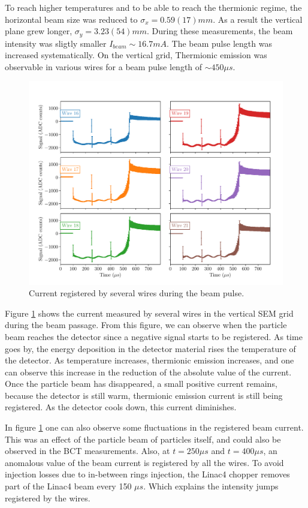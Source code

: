 To reach higher temperatures and to be able to reach the thermionic regime, the horizontal beam size was reduced to $\sigma_x = 0.59(17) mm$. As a result the vertical plane grew longer, $\sigma_y = 3.23(54) mm$. During these measurements, the beam intensity was sligtly smaller $I_{beam} \sim 16.7 mA$. The beam pulse length was increased systematically. On the vertical grid, Thermionic emission was observable in various wires for a beam pulse length of $\sim 450 \mu s$. 

\begin{figure}[h]
    \centering
    \includegraphics[width=0.9\columnwidth]{Figure_ThermionicMeasurements/VerticalThermoCurrent.pdf}
    \caption{Current registered by several wires during the beam pulse.}
    \label{fig:MeasuredThermo}
\end{figure}

Figure \ref{fig:MeasuredThermo} shows the current measured by several wires in the vertical SEM grid during the beam passage. From this figure, we can observe when the particle beam reaches the detector since a negative signal starts to be registered. As time goes by, the energy deposition in the detector material rises the temperature of the detector. As temperature increases, thermionic emission increases, and one can observe this increase in the reduction of the absolute value of the current. Once the particle beam has disappeared, a small positive current remains, because the detector is still warm, thermionic emission current is still being registered.  As the detector cools down, this current diminishes. 

In figure \ref{fig:MeasuredThermo} one can also observe some fluctuations in the registered beam current. This was an effect of the particle beam of particles itself, and could also be observed in the BCT measurements. Also, at $t = 250 \mu s$ and $t = 400 \mu s$, an anomalous value of the beam current is registered by all the wires. To avoid injection losses due to in-between rings injection, the Linac4 chopper removes part of the Linac4 beam every 150 $\mu s$. Which explains the intensity jumps registered by the wires. 

